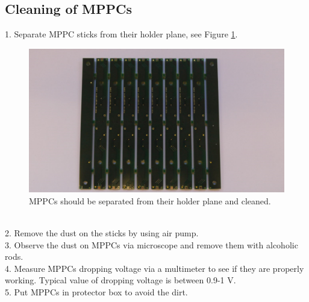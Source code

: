 \documentclass[a4paper]{article}\linespread{1.4}
\begin{document}
\subsection{Cleaning of MPPCs}
1.	Separate  MPPC sticks from their holder plane, see Figure \ref{fig:mppcs}.
\begin{figure}[h!] \hspace*{-0.5cm} \includegraphics[width=135mm,scale=2.0]{figures/mppcspaint.png} \caption{MPPCs should be separated from their holder plane and cleaned.}  \label{fig:mppcs}\end{figure}
\\2.	Remove the dust on the sticks by using air pump.
\\3.	Observe the dust on MPPCs via microscope and remove them with alcoholic rods.
\\4.	Measure MPPCs dropping voltage via a multimeter to see if they are properly working. Typical value of dropping voltage is between 0.9-1 V.
\\5.	Put MPPCs in protector box to avoid the dirt.
\end{document}
